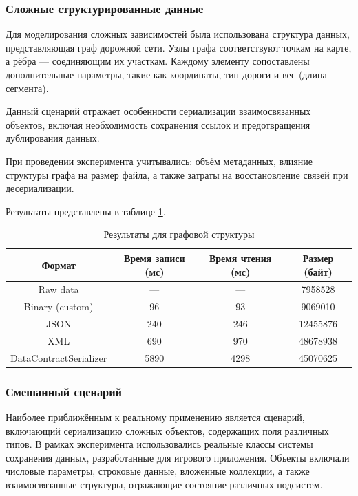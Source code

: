\documentclass[coursework]{SCWorks}
\begin{document}
\subsubsection{Сложные структурированные данные}

Для моделирования сложных зависимостей была использована структура данных, представляющая граф дорожной сети. Узлы графа соответствуют точкам на карте, а рёбра — соединяющим их участкам. Каждому элементу сопоставлены дополнительные параметры, такие как координаты, тип дороги и вес (длина сегмента).

Данный сценарий отражает особенности сериализации взаимосвязанных объектов, включая необходимость сохранения ссылок и предотвращения дублирования данных.

При проведении эксперимента учитывались:
объём метаданных, влияние структуры графа на размер файла, а также затраты на восстановление связей при десериализации.

Результаты представлены в таблице \ref{tab:graph_results}.

\begin{table}[h]
\centering
\caption{Результаты для графовой структуры}
\label{tab:graph_results}
\begin{tabular}{|c|c|c|c|}
\hline
Формат & Время записи (мс) & Время чтения (мс) & Размер (байт) \\ \hline
Raw data & --- & --- & 7958528  \\ \hline
Binary (custom) & 96 & 93 & 9069010  \\ \hline
JSON & 240 & 246 & 12455876\\ \hline
XML & 690 & 970 & 48678938 \\ \hline
DataContractSerializer & 5890 & 4298 & 45070625 \\ \hline
\end{tabular}
\end{table}

\subsubsection{Смешанный сценарий}

Наиболее приближённым к реальному применению является сценарий, включающий сериализацию сложных объектов, содержащих поля различных типов. В рамках эксперимента использовались реальные классы системы сохранения данных, разработанные для игрового приложения. Объекты включали числовые параметры, строковые данные, вложенные коллекции, а также взаимосвязанные структуры, отражающие состояние различных подсистем.
\end{document}
